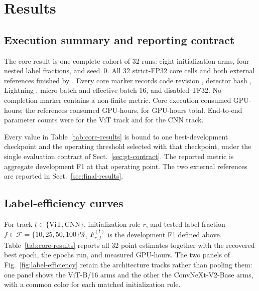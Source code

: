 \section{Results}
\label{sec:results}

\subsection{Execution summary and reporting contract}
\label{sec:result-provenance}

The core result is one complete cohort of 32 runs: eight initialization arms,
four nested label fractions, and seed~0. All 32 strict-FP32 core cells and
both external references finished by \ResultCompletedUTC. Every core marker
records code revision \texttt{\ResultCodeRev}, detector hash
\texttt{\ResultDetectorHash}, Lightning \texttt{\ResultPrecision}, micro-batch
and effective batch 16, and disabled TF32. No completion marker contains a
non-finite metric. Core execution consumed \ResultCoreGPUHours{} GPU-hours;
the references consumed \ResultReferenceGPUHours{} GPU-hours, for
\ResultTotalGPUHours{} GPU-hours total. End-to-end parameter counts were
\ResultVitParameterCount{} for the ViT track and \ResultCnnParameterCount{}
for the CNN track.

Every value in Table~\ref{tab:core-results} is bound to one best-development
checkpoint and the operating threshold selected with that checkpoint, under
the single evaluation contract of Sect.~\ref{sec:gt-contract}. The reported
metric is aggregate development F1 at that operating point. The two external
references are reported in Sect.~\ref{sec:final-results}.

\subsection{Label-efficiency curves}
\label{sec:label-efficiency-results}




For track $t\in\{\mathrm{ViT},\mathrm{CNN}\}$, initialization role $r$, and
tested label fraction $f\in\mathcal{F}=\{10,25,50,100\}\%$, $F_{r,f}^{(t)}$
is the development F1 defined above. Table~\ref{tab:core-results} reports all
32 point estimates together with the recovered best epoch, the epochs run,
and measured GPU-hours. The two panels of
Fig.~\ref{fig:label-efficiency} retain the architecture tracks rather than
pooling them: one panel shows the ViT-B/16 arms and the other the
ConvNeXt-V2-Base arms, with a common color for each matched initialization
role.

